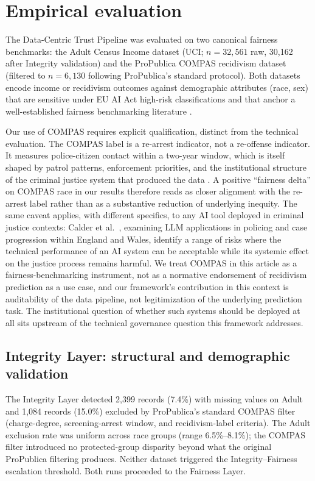 \documentclass[11pt]{article}
\begin{document}
\section{Empirical evaluation}
\label{sec:results}

The Data-Centric Trust Pipeline was evaluated on two canonical fairness benchmarks: the Adult Census Income dataset (UCI; $n = 32{,}561$ raw, 30{,}162 after Integrity validation) and the ProPublica COMPAS recidivism dataset (filtered to $n = 6{,}130$ following ProPublica's standard protocol). Both datasets encode income or recidivism outcomes against demographic attributes (race, sex) that are sensitive under EU AI Act high-risk classifications and that anchor a well-established fairness benchmarking literature \cite{Bao2021}.

Our use of COMPAS requires explicit qualification, distinct from the technical evaluation. The COMPAS label is a re-arrest indicator, not a re-offense indicator. It measures police-citizen contact within a two-year window, which is itself shaped by patrol patterns, enforcement priorities, and the institutional structure of the criminal justice system that produced the data \cite{Bao2021}. A positive ``fairness delta'' on COMPAS race in our results therefore reads as closer alignment with the re-arrest label rather than as a substantive reduction of underlying inequity. The same caveat applies, with different specifics, to any AI tool deployed in criminal justice contexts: Calder et al.\ \cite{Calder2026Responsible}, examining LLM applications in policing and case progression within England and Wales, identify a range of risks where the technical performance of an AI system can be acceptable while its systemic effect on the justice process remains harmful. We treat COMPAS in this article as a fairness-benchmarking instrument, not as a normative endorsement of recidivism prediction as a use case, and our framework's contribution in this context is auditability of the data pipeline, not legitimization of the underlying prediction task. The institutional question of whether such systems should be deployed at all sits upstream of the technical governance question this framework addresses.

\subsection{Integrity Layer: structural and demographic validation}

The Integrity Layer detected 2,399 records (7.4\%) with missing values on Adult and 1,084 records (15.0\%) excluded by ProPublica's standard COMPAS filter (charge-degree, screening-arrest window, and recidivism-label criteria). The Adult exclusion rate was uniform across race groups (range 6.5\%--8.1\%); the COMPAS filter introduced no protected-group disparity beyond what the original ProPublica filtering produces. Neither dataset triggered the Integrity--Fairness escalation threshold. Both runs proceeded to the Fairness Layer.
\end{document}
